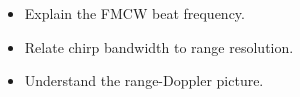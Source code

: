 \begin{objectives}
\begin{itemize}[leftmargin=1.4em,itemsep=2pt]
\item Explain the FMCW beat frequency.
\item Relate chirp bandwidth to range resolution.
\item Understand the range-Doppler picture.
\end{itemize}
\end{objectives}
